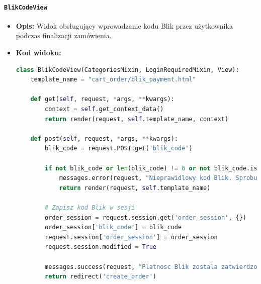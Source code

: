 \documentclass[12pt,a4paper,oneside]{article}
\theoremstyle{definition}
\numberwithin{equation}{section}
\begin{document}
\paragraph{\texttt{BlikCodeView}}
\begin{itemize}
    \item \textbf{Opis:} Widok obsługujący wprowadzanie kodu Blik przez użytkownika podczas finalizacji zamówienia.
    \item \textbf{Kod widoku:}
\begin{lstlisting}[language=Python, caption=\texttt{BlikCodeView}]
class BlikCodeView(CategoriesMixin, LoginRequiredMixin, View):
    template_name = "cart_order/blik_payment.html"

    def get(self, request, *args, **kwargs):
        context = self.get_context_data()
        return render(request, self.template_name, context)

    def post(self, request, *args, **kwargs):
        blik_code = request.POST.get('blik_code')

        if not blik_code or len(blik_code) != 6 or not blik_code.isdigit():
            messages.error(request, "Nieprawidlowy kod Blik. Sprobuj ponownie.")
            return render(request, self.template_name)

        # Zapisz kod Blik w sesji
        order_session = request.session.get('order_session', {})
        order_session['blik_code'] = blik_code
        request.session['order_session'] = order_session
        request.session.modified = True

        messages.success(request, "Platnosc Blik zostala zatwierdzona.")
        return redirect('create_order')
\end{lstlisting}


\end{itemize}
\end{document}
